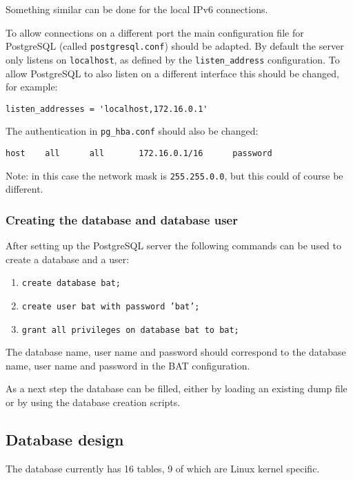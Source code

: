 \documentclass[10pt,a4paper]{article}
\begin{document}
Something similar can be done for the local IPv6 connections.

To allow connections on a different port the main configuration file for
PostgreSQL (called \texttt{postgresql.conf}) should be adapted. By default the
server only listens on \texttt{localhost}, as defined by the
\texttt{listen\_address} configuration. To allow PostgreSQL to also listen on a
different interface this should be changed, for example:

\begin{verbatim}
listen_addresses = 'localhost,172.16.0.1'
\end{verbatim}

The authentication in \texttt{pg\_hba.conf} should also be changed:

\begin{verbatim}
host    all      all       172.16.0.1/16      password
\end{verbatim}

Note: in this case the network mask is \texttt{255.255.0.0}, but this could
of course be different.

\subsubsection{Creating the database and database user}

After setting up the PostgreSQL server the following commands can be used to
create a database and a user:

\begin{enumerate}
\item \texttt{create database bat;}
\item \texttt{create user bat with password 'bat';}
\item \texttt{grant all privileges on database bat to bat;}
\end{enumerate}

The database name, user name and password should correspond to the database
name, user name and password in the BAT configuration.

As a next step the database can be filled, either by loading an existing dump
file or by using the database creation scripts.

\subsection{Database design}

The database currently has 16 tables, 9 of which are Linux kernel specific.
\end{document}
